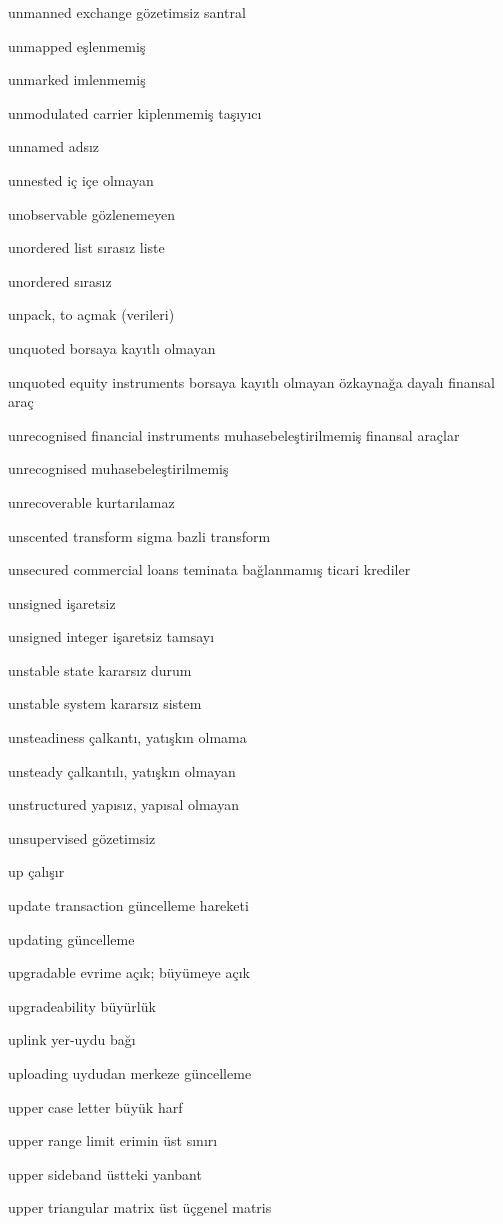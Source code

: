 \documentclass[12pt,fleqn]{article}\usepackage{../../common}
\begin{document}
unmanned exchange gözetimsiz santral

unmapped eşlenmemiş

unmarked imlenmemiş

unmodulated carrier kiplenmemiş taşıyıcı

unnamed adsız

unnested iç içe olmayan

unobservable gözlenemeyen

unordered list sırasız liste

unordered sırasız

unpack, to açmak (verileri)

unquoted borsaya kayıtlı olmayan

unquoted equity instruments borsaya kayıtlı olmayan özkaynağa dayalı finansal araç

unrecognised financial instruments muhasebeleştirilmemiş finansal araçlar

unrecognised muhasebeleştirilmemiş

unrecoverable kurtarılamaz

unscented transform sigma bazli transform

unsecured commercial loans teminata bağlanmamış ticari krediler

unsigned işaretsiz

unsigned integer işaretsiz tamsayı

unstable state kararsız durum

unstable system kararsız sistem

unsteadiness çalkantı, yatışkın olmama

unsteady çalkantılı, yatışkın olmayan

unstructured yapısız, yapısal olmayan

unsupervised gözetimsiz

up çalışır

update transaction güncelleme hareketi

updating güncelleme

upgradable evrime açık; büyümeye açık

upgradeability büyürlük

uplink yer-uydu bağı

uploading uydudan merkeze güncelleme

upper case letter büyük harf

upper range limit erimin üst sınırı

upper sideband üstteki yanbant

upper triangular matrix üst üçgenel matris
\end{document}

